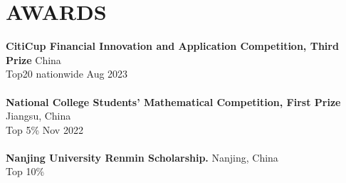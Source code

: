 \section*{AWARDS}
\textbf{CitiCup Financial Innovation and Application Competition, Third Prize}  \hfill China\\ 
Top20 nationwide \hfill Aug 2023\\ \\
\textbf{National College Students' Mathematical Competition, First Prize}  \hfill Jiangsu, China\\ 
Top 5\% \hfill Nov 2022\\ \\
\textbf{Nanjing University Renmin Scholarship.}  \hfill Nanjing, China\\ 
Top 10\%\\ \\